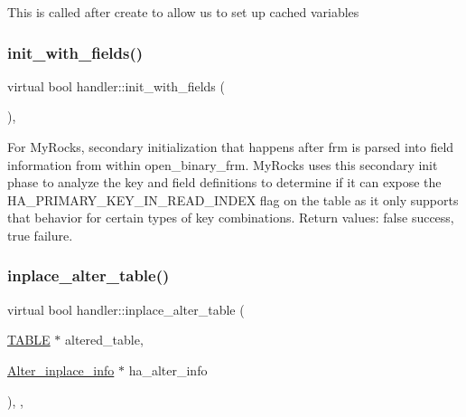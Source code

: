 This is called after create to allow us to set up cached variables \mbox{\label{classhandler_a6b6facc9d1d0bda98c814660eaa9bad7}} 
\subsubsection{\texorpdfstring{init\+\_\+with\+\_\+fields()}{init\_with\_fields()}}
{\footnotesize\ttfamily virtual bool handler\+::init\+\_\+with\+\_\+fields (\begin{DoxyParamCaption}{ }\end{DoxyParamCaption})\hspace{0.3cm}{\ttfamily [inline]}, {\ttfamily [virtual]}}

For My\+Rocks, secondary initialization that happens after frm is parsed into field information from within open\+\_\+binary\+\_\+frm. My\+Rocks uses this secondary init phase to analyze the key and field definitions to determine if it can expose the H\+A\+\_\+\+P\+R\+I\+M\+A\+R\+Y\+\_\+\+K\+E\+Y\+\_\+\+I\+N\+\_\+\+R\+E\+A\+D\+\_\+\+I\+N\+D\+EX flag on the table as it only supports that behavior for certain types of key combinations. Return values\+: false success, true failure. \mbox{\label{classhandler_a90b4c3a8fe1c89c6ccfec1f4b144754a}} 
\subsubsection{\texorpdfstring{inplace\+\_\+alter\+\_\+table()}{inplace\_alter\_table()}}
{\footnotesize\ttfamily virtual bool handler\+::inplace\+\_\+alter\+\_\+table (\begin{DoxyParamCaption}\item[{\mbox{\hyperlink{structTABLE}{T\+A\+B\+LE}} $\ast$}]{altered\+\_\+table,  }\item[{\mbox{\hyperlink{classAlter__inplace__info}{Alter\+\_\+inplace\+\_\+info}} $\ast$}]{ha\+\_\+alter\+\_\+info }\end{DoxyParamCaption})\hspace{0.3cm}{\ttfamily [inline]}, {\ttfamily [protected]}, {\ttfamily [virtual]}}

